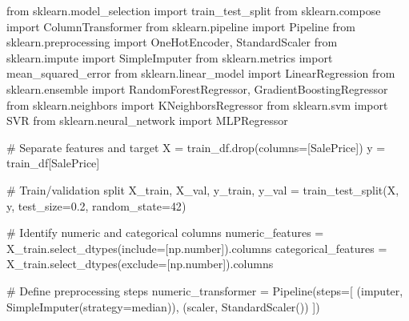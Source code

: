 \documentclass[
]{article}
\newenvironment{Shaded}{\begin{snugshade}}{\end{snugshade}}
\newcommand{\CommentTok}[1]{\textcolor[rgb]{0.37,0.37,0.37}{#1}}
\newcommand{\DecValTok}[1]{\textcolor[rgb]{0.68,0.00,0.00}{#1}}
\newcommand{\FloatTok}[1]{\textcolor[rgb]{0.68,0.00,0.00}{#1}}
\newcommand{\ImportTok}[1]{\textcolor[rgb]{0.00,0.46,0.62}{#1}}
\newcommand{\NormalTok}[1]{\textcolor[rgb]{0.00,0.23,0.31}{#1}}
\newcommand{\OperatorTok}[1]{\textcolor[rgb]{0.37,0.37,0.37}{#1}}
\newcommand{\StringTok}[1]{\textcolor[rgb]{0.13,0.47,0.30}{#1}}
\begin{document}
\begin{Shaded}
\begin{Highlighting}[]
\ImportTok{from}\NormalTok{ sklearn.model\_selection }\ImportTok{import}\NormalTok{ train\_test\_split}
\ImportTok{from}\NormalTok{ sklearn.compose }\ImportTok{import}\NormalTok{ ColumnTransformer}
\ImportTok{from}\NormalTok{ sklearn.pipeline }\ImportTok{import}\NormalTok{ Pipeline}
\ImportTok{from}\NormalTok{ sklearn.preprocessing }\ImportTok{import}\NormalTok{ OneHotEncoder, StandardScaler}
\ImportTok{from}\NormalTok{ sklearn.impute }\ImportTok{import}\NormalTok{ SimpleImputer}
\ImportTok{from}\NormalTok{ sklearn.metrics }\ImportTok{import}\NormalTok{ mean\_squared\_error}
\ImportTok{from}\NormalTok{ sklearn.linear\_model }\ImportTok{import}\NormalTok{ LinearRegression}
\ImportTok{from}\NormalTok{ sklearn.ensemble }\ImportTok{import}\NormalTok{ RandomForestRegressor, GradientBoostingRegressor}
\ImportTok{from}\NormalTok{ sklearn.neighbors }\ImportTok{import}\NormalTok{ KNeighborsRegressor}
\ImportTok{from}\NormalTok{ sklearn.svm }\ImportTok{import}\NormalTok{ SVR}
\ImportTok{from}\NormalTok{ sklearn.neural\_network }\ImportTok{import}\NormalTok{ MLPRegressor}

\CommentTok{\# Separate features and target}
\NormalTok{X }\OperatorTok{=}\NormalTok{ train\_df.drop(columns}\OperatorTok{=}\NormalTok{[}\StringTok{\textquotesingle{}SalePrice\textquotesingle{}}\NormalTok{])}
\NormalTok{y }\OperatorTok{=}\NormalTok{ train\_df[}\StringTok{\textquotesingle{}SalePrice\textquotesingle{}}\NormalTok{]}

\CommentTok{\# Train/validation split}
\NormalTok{X\_train, X\_val, y\_train, y\_val }\OperatorTok{=}\NormalTok{ train\_test\_split(X, y, test\_size}\OperatorTok{=}\FloatTok{0.2}\NormalTok{, random\_state}\OperatorTok{=}\DecValTok{42}\NormalTok{)}

\CommentTok{\# Identify numeric and categorical columns}
\NormalTok{numeric\_features }\OperatorTok{=}\NormalTok{ X\_train.select\_dtypes(include}\OperatorTok{=}\NormalTok{[np.number]).columns}
\NormalTok{categorical\_features }\OperatorTok{=}\NormalTok{ X\_train.select\_dtypes(exclude}\OperatorTok{=}\NormalTok{[np.number]).columns}

\CommentTok{\# Define preprocessing steps}
\NormalTok{numeric\_transformer }\OperatorTok{=}\NormalTok{ Pipeline(steps}\OperatorTok{=}\NormalTok{[}
\NormalTok{    (}\StringTok{\textquotesingle{}imputer\textquotesingle{}}\NormalTok{, SimpleImputer(strategy}\OperatorTok{=}\StringTok{\textquotesingle{}median\textquotesingle{}}\NormalTok{)),}
\NormalTok{    (}\StringTok{\textquotesingle{}scaler\textquotesingle{}}\NormalTok{, StandardScaler())}
\NormalTok{])}


\end{Highlighting}
\end{Shaded}
\end{document}
